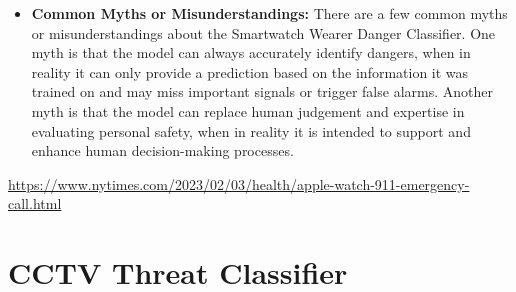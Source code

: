 \begin{itemize}
    \item \textbf{Common Myths or Misunderstandings:} There are a few common myths or misunderstandings about the Smartwatch Wearer Danger Classifier. One myth is that the model can always accurately identify dangers, when in reality it can only provide a prediction based on the information it was trained on and may miss important signals or trigger false alarms. Another myth is that the model can replace human judgement and expertise in evaluating personal safety, when in reality it is intended to support and enhance human decision-making processes.
\end{itemize}

\url{https://www.nytimes.com/2023/02/03/health/apple-watch-911-emergency-call.html}

\section{CCTV Threat Classifier}

